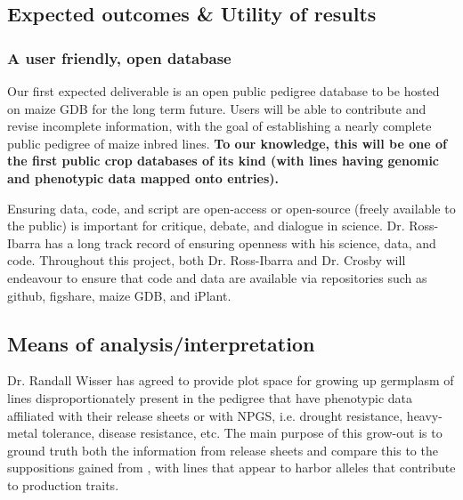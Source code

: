 \documentclass[12pt]{article}
\begin{document}
\subsection*{Expected outcomes \& Utility of results}

\subsubsection*{A user friendly, open database}

Our first expected deliverable is an open public pedigree database to be hosted on maize GDB for the long term future. Users will be able to contribute and revise incomplete information, with the goal of establishing a nearly complete public pedigree of maize inbred lines. \textbf{To our knowledge, this will be one of the first public crop databases of its kind (with lines having genomic and phenotypic data mapped onto entries).}
\par Ensuring data, code, and script are open-access or open-source (freely available to the public) is important for critique, debate, and dialogue in science. Dr. Ross-Ibarra has a long track record of ensuring openness with his science, data, and code. Throughout this project, both Dr. Ross-Ibarra and Dr. Crosby will endeavour to ensure that code and data are available via repositories such as github, figshare, maize GDB, and iPlant.


\subsection*{Means of analysis/interpretation}
Dr. Randall Wisser has agreed to provide plot space for growing up germplasm of lines disproportionately present in the pedigree that have phenotypic data affiliated with their release sheets or with NPGS, i.e. drought resistance, heavy-metal tolerance, disease resistance, etc. The main purpose of this grow-out is to ground truth both the information from release sheets and compare this to the suppositions gained from \citep{Berg:2014bs}, with lines that appear to harbor alleles that contribute to production traits.
\end{document}
